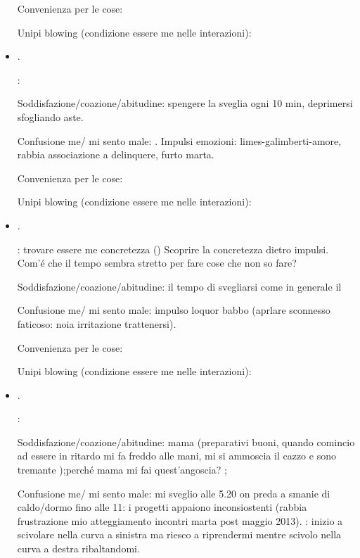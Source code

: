 \begin{itemize}
Convenienza per le cose:

Unipi blowing (condizione essere me nelle interazioni):

\item {}.

:

Soddisfazione/coazione/abitudine: spengere la sveglia ogni 10 min, deprimersi sfogliando aste.

Confusione me/ mi sento male: . Impulsi emozioni: limes-galimberti-amore, rabbia associazione a delinquere, furto marta. 

Convenienza per le cose:

Unipi blowing (condizione essere me nelle interazioni):

\item {}.

: trovare essere me concretezza () Scoprire la concretezza dietro impulsi. Com'\'e che il tempo sembra stretto per fare cose che non so fare?

Soddisfazione/coazione/abitudine: il tempo di svegliarsi come in generale il 

Confusione me/ mi sento male: impulso loquor babbo (aprlare sconnesso faticoso: noia irritazione trattenersi).

Convenienza per le cose:

Unipi blowing (condizione essere me nelle interazioni): 

\item {}.

:

Soddisfazione/coazione/abitudine: mama (preparativi buoni, quando comincio ad essere in ritardo mi fa freddo alle mani, mi si ammoscia il cazzo e sono tremante );perch\'e mama mi fai quest'angoscia? ; 

Confusione me/ mi sento male: mi sveglio alle 5.20 on preda a smanie di caldo/dormo fino alle 11: i progetti appaiono inconsiostenti (rabbia frustrazione mio atteggiamento incontri marta post maggio 2013). : inizio a scivolare nella curva a sinistra ma riesco a riprendermi mentre scivolo nella curva a destra ribaltandomi. 


\end{itemize}
